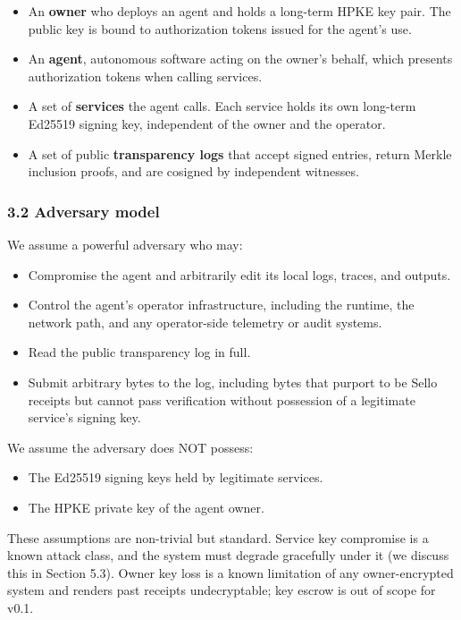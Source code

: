 \documentclass[
  11pt,
]{article}
\providecommand{\tightlist}{%
  \setlength{\itemsep}{0pt}\setlength{\parskip}{0pt}}
\begin{document}
\begin{itemize}
\tightlist
\item
  An \textbf{owner} who deploys an agent and holds a long-term HPKE key
  pair. The public key is bound to authorization tokens issued for the
  agent's use.
\item
  An \textbf{agent}, autonomous software acting on the owner's behalf,
  which presents authorization tokens when calling services.
\item
  A set of \textbf{services} the agent calls. Each service holds its own
  long-term Ed25519 signing key, independent of the owner and the
  operator.
\item
  A set of public \textbf{transparency logs} that accept signed entries,
  return Merkle inclusion proofs, and are cosigned by independent
  witnesses.
\end{itemize}

\hypertarget{adversary-model}{%
\subsubsection{3.2 Adversary model}\label{adversary-model}}

We assume a powerful adversary who may:

\begin{itemize}
\tightlist
\item
  Compromise the agent and arbitrarily edit its local logs, traces, and
  outputs.
\item
  Control the agent's operator infrastructure, including the runtime,
  the network path, and any operator-side telemetry or audit systems.
\item
  Read the public transparency log in full.
\item
  Submit arbitrary bytes to the log, including bytes that purport to be
  Sello receipts but cannot pass verification without possession of a
  legitimate service's signing key.
\end{itemize}

We assume the adversary does NOT possess:

\begin{itemize}
\tightlist
\item
  The Ed25519 signing keys held by legitimate services.
\item
  The HPKE private key of the agent owner.
\end{itemize}

These assumptions are non-trivial but standard. Service key compromise
is a known attack class, and the system must degrade gracefully under it
(we discuss this in Section 5.3). Owner key loss is a known limitation
of any owner-encrypted system and renders past receipts undecryptable;
key escrow is out of scope for v0.1.
\end{document}
